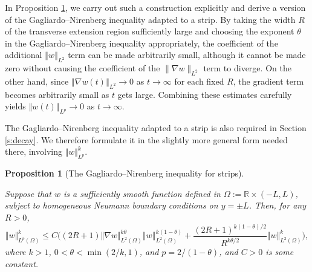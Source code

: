 \documentclass[final,11pt]{article}
\renewcommand{\leq}{\leqslant}
\theoremstyle{definition} %
\newcommand{\LLO}{L^2(\Omega)}
\newcommand{\lv}{\left\Vert}
\newcommand{\rv}{\right\Vert}
\newcommand{\OM}{\mathbb{R}\times(-L,L)}
\theoremstyle{plain}
\newtheorem{proposition}[theorem]{Proposition}
\theoremstyle{definition} %
\theoremstyle{remark}
\begin{document}
In Proposition \ref{prop:G-N_strip}, we carry out such a construction explicitly and derive a version of the Gagliardo--Nirenberg inequality adapted to a strip. By taking the width $R$ of the transverse extension region sufficiently large and choosing the exponent $\theta$ in the Gagliardo--Nirenberg inequality appropriately, the coefficient of the additional $\lv w\rv_{L^2}$ term can be made arbitrarily small, although it cannot be made zero without causing the coefficient of the $\|\nabla w\|_{L^2}$ term to diverge. 
On the other hand, since $\lv\nabla w(t)\rv_{L^2}\to0$ as $t\to\infty$ for each fixed $R$, the gradient term becomes arbitrarily small as $t$ gets large. Combining these estimates carefully yields $\lv w(t)\rv_{L^p}\to0$ as $t\to\infty$. 

The Gagliardo--Nirenberg inequality adapted to a strip is also required in Section \ref{s:decay}. We therefore formulate it in the slightly more general form needed there, involving $\Vert w \Vert_{L^p}^k $. 

\begin{proposition}[The Gagliardo--Nirenberg inequality for strips]\label{prop:G-N_strip} 

Suppose that $ w$ is a sufficiently smooth function defined in $\Omega := \OM$, subject to homogeneous Neumann boundary conditions on $y=\pm L$. Then, for any $R>0$, 
\[
\Vert w \Vert_{L^p(\Omega)}^k \leq  C\Big((2R+1)\Vert \nabla  w \Vert_{\LLO}^{k\theta}\lv  w\rv_{\LLO}^{k(1-\theta)} + \frac{(2R+1)^{k(1-\theta)/2}}{R^{k\theta/2}} \Vert  w \Vert_{\LLO}^k\Big),
\]
where $k >1$,  $0 < \theta < \min(2/k,1)$, and $p = 2/(1-\theta)$, and $C>0$ is some constant. 
\end{proposition}
\end{document}
